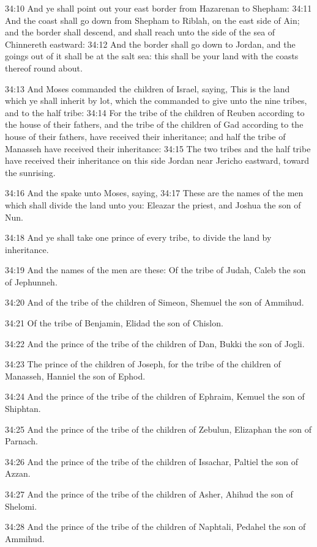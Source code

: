 34:10 And ye shall point out your east border from Hazarenan to Shepham: 34:11 And the coast shall go down from Shepham to Riblah, on the east side of Ain; and the border shall descend, and shall reach unto the side of the sea of Chinnereth eastward: 34:12 And the border shall go down to Jordan, and the goings out of it shall be at the salt sea: this shall be your land with the coasts thereof round about.

34:13 And Moses commanded the children of Israel, saying, This is the land which ye shall inherit by lot, which the \LORD commanded to give unto the nine tribes, and to the half tribe: 34:14 For the tribe of the children of Reuben according to the house of their fathers, and the tribe of the children of Gad according to the house of their fathers, have received their inheritance; and half the tribe of Manasseh have received their inheritance: 34:15 The two tribes and the half tribe have received their inheritance on this side Jordan near Jericho eastward, toward the sunrising.

34:16 And the \LORD spake unto Moses, saying, 34:17 These are the names of the men which shall divide the land unto you: Eleazar the priest, and Joshua the son of Nun.

34:18 And ye shall take one prince of every tribe, to divide the land by inheritance.

34:19 And the names of the men are these: Of the tribe of Judah, Caleb the son of Jephunneh.

34:20 And of the tribe of the children of Simeon, Shemuel the son of Ammihud.

34:21 Of the tribe of Benjamin, Elidad the son of Chislon.

34:22 And the prince of the tribe of the children of Dan, Bukki the son of Jogli.

34:23 The prince of the children of Joseph, for the tribe of the children of Manasseh, Hanniel the son of Ephod.

34:24 And the prince of the tribe of the children of Ephraim, Kemuel the son of Shiphtan.

34:25 And the prince of the tribe of the children of Zebulun, Elizaphan the son of Parnach.

34:26 And the prince of the tribe of the children of Issachar, Paltiel the son of Azzan.

34:27 And the prince of the tribe of the children of Asher, Ahihud the son of Shelomi.

34:28 And the prince of the tribe of the children of Naphtali, Pedahel the son of Ammihud.

